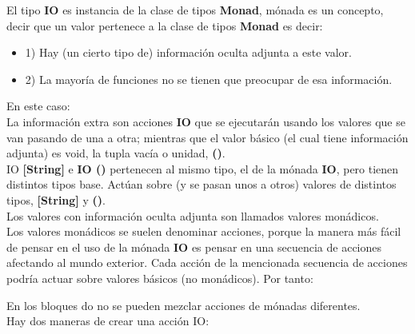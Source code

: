 El tipo \textbf{IO} es instancia de la clase de tipos \textbf{Monad}, m\'onada es un concepto, decir que un valor pertenece a la clase de tipos \textbf{\textbf{Monad}} es decir:

\begin{itemize}
  \item 1) Hay (un cierto tipo de) informaci\'on oculta adjunta a este valor.
  \item 2) La mayor\'ia de funciones no se tienen que preocupar de esa informaci\'on.
\end{itemize}

En este caso:\\

La informaci\'on extra son acciones \textbf{IO} que se ejecutar\'an usando los valores que se van pasando de una a otra; mientras que el valor b\'asico (el cual tiene informaci\'on adjunta) es void, la tupla vac\'ia o unidad, \textbf{()}.\\

IO \textbf{[String]} e \textbf{IO ()} pertenecen al mismo tipo, el de la m\'onada \textbf{IO}, pero tienen distintos tipos base. Act\'uan sobre (y se pasan unos a otros) valores de distintos tipos, \textbf{[String]} y \textbf{()}.\\

Los valores con informaci\'on oculta adjunta son llamados valores mon\'adicos.\\

Los valores mon\'adicos se suelen denominar acciones, porque la manera m\'as f\'acil de pensar en el uso de la m\'onada \textbf{IO} es pensar en una secuencia de acciones afectando al mundo exterior. Cada acci\'on de la mencionada secuencia de acciones podr\'ia actuar sobre valores b\'asicos (no mon\'adicos). Por tanto:


En los bloques do no se pueden mezclar acciones de m\'onadas diferentes.\\

Hay dos maneras de crear una acci\'on IO:\\


